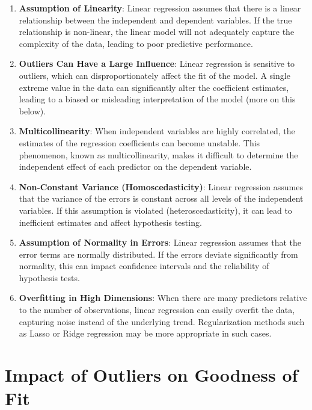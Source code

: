 \documentclass[
  12 pt,
  a4paper,
]{book}
\numberwithin{equation}{section}
\theoremstyle{plain}      %
\theoremstyle{definition} %
\theoremstyle{remark}     %
\theoremstyle{note}         %
\begin{document}
\begin{enumerate}
\def\labelenumi{\arabic{enumi}.}
\item
  \textbf{Assumption of Linearity}: Linear regression assumes that there
  is a linear relationship between the independent and dependent
  variables. If the true relationship is non-linear, the linear model
  will not adequately capture the complexity of the data, leading to
  poor predictive performance.
\item
  \textbf{Outliers Can Have a Large Influence}: Linear regression is
  sensitive to outliers, which can disproportionately affect the fit of
  the model. A single extreme value in the data can significantly alter
  the coefficient estimates, leading to a biased or misleading
  interpretation of the model (more on this below).
\item
  \textbf{Multicollinearity}: When independent variables are highly
  correlated, the estimates of the regression coefficients can become
  unstable. This phenomenon, known as multicollinearity, makes it
  difficult to determine the independent effect of each predictor on the
  dependent variable.
\item
  \textbf{Non-Constant Variance (Homoscedasticity)}: Linear regression
  assumes that the variance of the errors is constant across all levels
  of the independent variables. If this assumption is violated
  (heteroscedasticity), it can lead to inefficient estimates and affect
  hypothesis testing.
\item
  \textbf{Assumption of Normality in Errors}: Linear regression assumes
  that the error terms are normally distributed. If the errors deviate
  significantly from normality, this can impact confidence intervals and
  the reliability of hypothesis tests.
\item
  \textbf{Overfitting in High Dimensions}: When there are many
  predictors relative to the number of observations, linear regression
  can easily overfit the data, capturing noise instead of the underlying
  trend. Regularization methods such as Lasso or Ridge regression may be
  more appropriate in such cases.
\end{enumerate}

\newpage

\hypertarget{impact-of-outliers-on-goodness-of-fit}{%
\section{Impact of Outliers on Goodness of
Fit}\label{impact-of-outliers-on-goodness-of-fit}}
\end{document}
